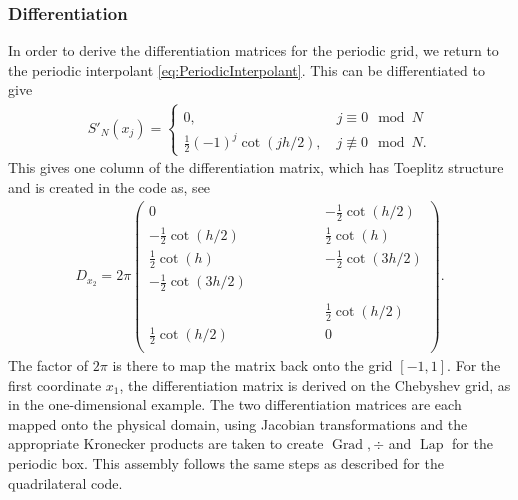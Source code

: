 \documentclass[11pt, a4paper]{article}
\theoremstyle{definition}
\DeclareMathOperator{\Grad}{Grad}
\DeclareMathOperator{\Lap}{Lap}
\begin{document}
\subsubsection{Differentiation}
In order to derive the differentiation matrices for the periodic grid, we return to the periodic interpolant \eqref{eq:PeriodicInterpolant}. This can be differentiated to give 
\begin{align*}
	S'_N(x_j) =\left\{\begin{array}{l} 0, \phantom{(-1)^j \cot(j h /2)} \quad j \equiv 0  \mod N\\
	\frac{1}{2} (-1)^j \cot(j h /2), \quad j \not \equiv 0  \mod N.\end{array}\right.
\end{align*}
This gives one column of the differentiation matrix, which has Toeplitz structure and is created in the code as, see \cite{bibTrefethen}
\begin{align*}
	D_{x_2} = 2\pi
	\begin{pmatrix}
		0 & & &  & &  & &-\frac{1}{2} \cot(h /2) \\
		-\frac{1}{2} \cot(h /2)&  & & &  & &   &\frac{1}{2} \cot(h) \\
		\frac{1}{2} \cot(h)& &  & & &    & & -\frac{1}{2} \cot(3 h /2)\\
		-\frac{1}{2} \cot( 3 h /2) & & &   & &  & & \\
		&  & & &   & &  & \\
		& & & &  & & & \frac{1}{2} \cot(h /2)\\
		\frac{1}{2} \cot(h /2)& &  & &   &  & & 0\\
	\end{pmatrix}.
\end{align*}
The factor of $2\pi$ is there to map the matrix back onto the grid $[-1,1]$. 
For the first coordinate $x_1$, the differentiation matrix is derived on the Chebyshev grid, as in the one-dimensional example. The two differentiation matrices are each mapped onto the physical domain, using Jacobian transformations and the appropriate Kronecker products are taken to create $\Grad, \div$ and $\Lap$ for the periodic box. This assembly follows the same steps as described for the quadrilateral code.
\end{document}
